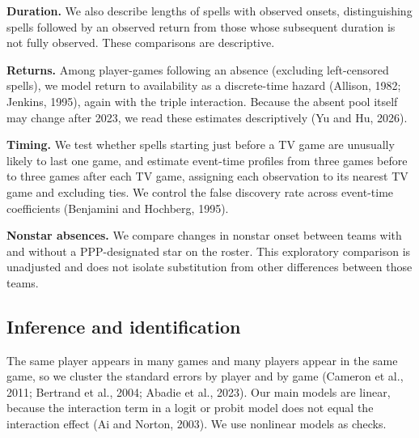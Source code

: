 \documentclass[11pt]{article}
\begin{document}
\noindent\textbf{Duration.} We also describe lengths of spells with observed onsets, distinguishing spells followed by an observed return from those whose subsequent duration is not fully observed. These comparisons are descriptive.\par\smallskip\noindent\textbf{Returns.} Among player-games following an absence (excluding left-censored spells), we model return to availability as a discrete-time hazard (Allison, 1982; Jenkins, 1995), again with the triple interaction. Because the absent pool itself may change after 2023, we read these estimates descriptively (Yu and Hu, 2026).

\noindent\textbf{Timing.} We test whether spells starting just before a TV game are unusually likely to last one game, and estimate event-time profiles from three games before to three games after each TV game, assigning each observation to its nearest TV game and excluding ties. We control the false discovery rate across event-time coefficients (Benjamini and Hochberg, 1995).

\noindent\textbf{Nonstar absences.} We compare changes in nonstar onset between teams with and without a PPP-designated star on the roster. This exploratory comparison is unadjusted and does not isolate substitution from other differences between those teams.

\subsection{Inference and identification}

The same player appears in many games and many players appear in the same game, so we cluster the standard errors by player and by game (Cameron et al., 2011; Bertrand et al., 2004; Abadie et al., 2023). Our main models are linear, because the interaction term in a logit or probit model does not equal the interaction effect (Ai and Norton, 2003). We use nonlinear models as checks.
\end{document}
